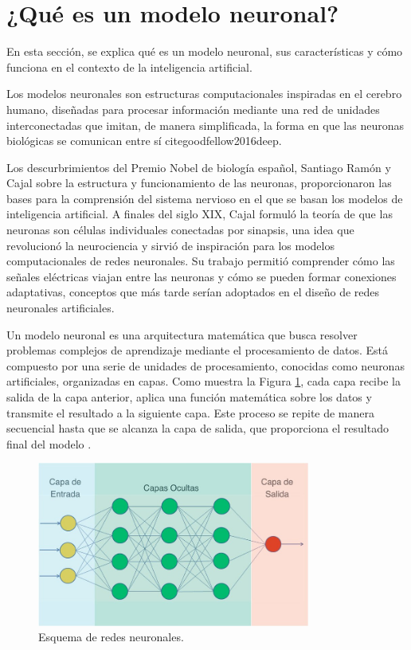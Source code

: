 
\section{¿Qué es un modelo neuronal?}

En esta sección, se explica qué es un modelo neuronal, sus características y cómo funciona en el contexto de la inteligencia artificial. 

Los modelos neuronales son estructuras computacionales inspiradas en el cerebro humano, diseñadas para procesar información mediante una red de unidades interconectadas que imitan, de manera simplificada, la forma en que las neuronas biológicas se comunican entre sí cite{goodfellow2016deep}.

Los descurbrimientos del Premio Nobel de biología español, Santiago Ramón y Cajal sobre la estructura y funcionamiento de las neuronas, proporcionaron las bases para la comprensión del sistema nervioso en el que se basan los modelos de inteligencia artificial. A finales del siglo XIX, Cajal formuló la teoría de que las neuronas son células individuales conectadas por sinapsis, una idea que revolucionó la neurociencia y sirvió de inspiración para los modelos computacionales de redes neuronales. Su trabajo permitió comprender cómo las señales eléctricas viajan entre las neuronas y cómo se pueden formar conexiones adaptativas, conceptos que más tarde serían adoptados en el diseño de redes neuronales artificiales.

Un modelo neuronal es una arquitectura matemática que busca resolver problemas complejos de aprendizaje mediante el procesamiento de datos. Está compuesto por una serie de unidades de procesamiento, conocidas como neuronas artificiales, organizadas en capas. Como muestra la Figura \ref{fig:esq-capas}, cada capa recibe la salida de la capa anterior, aplica una función matemática sobre los datos y transmite el resultado a la siguiente capa. Este proceso se repite de manera secuencial hasta que se alcanza la capa de salida, que proporciona el resultado final del modelo \cite{bishop2006pattern}.

\begin{figure}[H]
    \centering
    \includegraphics[width=0.8\textwidth]{./img/modelo/capas.png}
    \caption{Esquema de redes neuronales. \cite{aprendeia2021deep}}
    \label{fig:esq-capas}
\end{figure}


